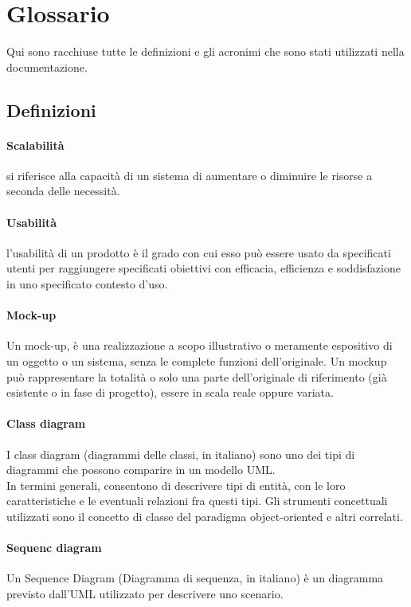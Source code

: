 \section{Glossario}
Qui sono racchiuse tutte le definizioni e gli acronimi che sono stati  utilizzati nella documentazione.
\subsection{Definizioni}

\paragraph{Scalabilità} si riferisce alla capacità di un sistema di aumentare o diminuire le risorse a seconda delle necessità.

\paragraph{Usabilità} l'usabilità di un prodotto è il grado con cui esso può essere usato da specificati utenti per
raggiungere specificati obiettivi con efficacia, efficienza e soddisfazione in uno specificato
contesto d'uso.
\paragraph{Mock-up} Un mock-up, è una realizzazione a scopo illustrativo o meramente espositivo di un oggetto o un sistema, senza le complete funzioni dell'originale. Un mockup può rappresentare la totalità o solo una parte dell'originale di riferimento (già esistente o in fase di progetto), essere in scala reale oppure variata.

\paragraph{Class diagram} I class diagram (diagrammi delle classi, in italiano) sono uno dei tipi di diagrammi che possono comparire in un modello UML.
\\
In termini generali, consentono di descrivere tipi di entità, con le loro caratteristiche e le eventuali relazioni fra questi tipi. Gli strumenti concettuali utilizzati sono il concetto di classe del paradigma object-oriented e altri correlati.
\paragraph{Sequenc diagram} Un Sequence Diagram (Diagramma di sequenza, in italiano) è un diagramma previsto dall'UML utilizzato per descrivere uno scenario.

